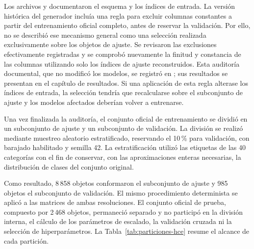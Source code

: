 Los archivos \protect{} y \protect{} documentaron el esquema y los índices de entrada. La versión histórica del generador incluía una regla para excluir columnas constantes a partir del entrenamiento oficial completo, antes de reservar la validación. Por ello, no se describió ese mecanismo general como una selección realizada exclusivamente sobre los objetos de ajuste. Se revisaron las exclusiones efectivamente registradas y se comprobó nuevamente la finitud y constancia de las columnas utilizando solo los índices de ajuste reconstruidos. Esta auditoría documental, que no modificó los modelos, se registró en \protect{}; sus resultados se presentan en el capítulo de resultados. Si una aplicación de esta regla alterase los índices de entrada, la selección tendría que recalcularse sobre el subconjunto de ajuste y los modelos afectados deberían volver a entrenarse.

Una vez finalizada la auditoría, el conjunto oficial de entrenamiento se dividió en un subconjunto de ajuste y un subconjunto de validación. La división se realizó mediante muestreo aleatorio estratificado, reservando el 10\,\% para validación, con barajado habilitado y semilla 42. La estratificación utilizó las etiquetas de las 40 categorías con el fin de conservar, con las aproximaciones enteras necesarias, la distribución de clases del conjunto original.

Como resultado, 8\,858 objetos conformaron el subconjunto de ajuste y 985 objetos el subconjunto de validación. El mismo procedimiento determinista se aplicó a las matrices de ambas resoluciones. El conjunto oficial de prueba, compuesto por 2\,468 objetos, permaneció separado y no participó en la división interna, el cálculo de los parámetros de escalado, la validación cruzada ni la selección de hiperparámetros. La Tabla~\ref{tab:particiones-hce} resume el alcance de cada partición.

